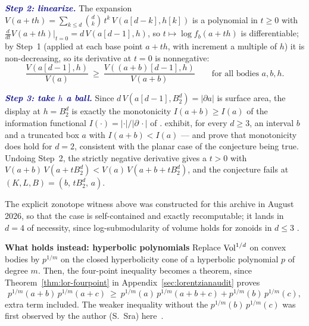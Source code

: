 \begin{cxrefutation}
\textcolor{darkblue}{\textbf{\emph{Step 2: linearize.}}}  The expansion
$V(a+th)=\sum_{k\le d}\binom dk\,t^k\,V(a[d{-}k],h[k])$ is a polynomial in
$t\ge0$ with $\tfrac{d}{dt}V(a+th)\bigl|_{t=0}=d\,V(a[d{-}1],h)$, so
$t\mapsto\log f_b(a+th)$ is differentiable; by Step~1 (applied at each base
point $a+th$, with increment a multiple of $h$) it is non-decreasing, so its
derivative at $t=0$ is nonnegative:
\[
\frac{V(a[d{-}1],h)}{V(a)}\ \ge\ \frac{V((a{+}b)[d{-}1],h)}{V(a+b)}
\qquad\text{for all bodies }a,b,h.
\]

\textcolor{darkblue}{\textbf{\emph{Step 3: take $h$ a ball.}}}  Since $d\,V(a[d{-}1],B_2^d)=|\partial a|$ is
surface area, the display at $h=B_2^d$ is exactly the monotonicity
$I(a+b)\ge I(a)$ of the information functional
$I(\cdot)=|\cdot|/|\partial\,\cdot|$ of \citet{DemboCoverThomas1991}.
\citet[Section~4.1]{ArtsteinFlorentinOstrover2014} exhibit, for every $d\ge3$,
an interval $b$ and a truncated box $a$ with $I(a+b)<I(a)$ --- and prove that
monotonicity does hold for $d=2$, consistent with the planar case of the
conjecture being true.  Undoing Step~2, the strictly negative derivative gives
a $t>0$ with $V(a+b)\,V(a+tB_2^d)<V(a)\,V(a+b+tB_2^d)$, and the conjecture
fails at $(K,L,B)=(b,\,tB_2^d,\,a)$.

The explicit zonotope witness above was constructed for this archive in August
2026, so that the case is self-contained and exactly recomputable; it lands in
$d=4$ of necessity, since log-submodularity of volume holds for zonoids in
$d\le3$ \citep{FradeliziMadimanMeyerZvavitch2024}.


\vskip4pt
\noindent\textbf{What holds instead: hyperbolic polynomials}
Replace $\operatorname{Vol}^{1/d}$ on convex bodies by $p^{1/m}$ on the closed hyperbolicity cone
of a hyperbolic polynomial $p$ of degree $m$. Then, the four-point inequality becomes a theorem, since
Theorem~\ref{thm:lor-fourpoint} in Appendix~\ref{sec:lorentzianaudit} proves
\[
p^{1/m}(a+b)\,p^{1/m}(a+c)\ \ge\ p^{1/m}(a)\,p^{1/m}(a+b+c)+p^{1/m}(b)\,p^{1/m}(c),
\]
extra term included. The weaker inequality without the $p^{1/m}(b)\,p^{1/m}(c)$ was first observed by the author (S.~Sra) here~\citep{sra2017MO}. %



\end{cxrefutation}
